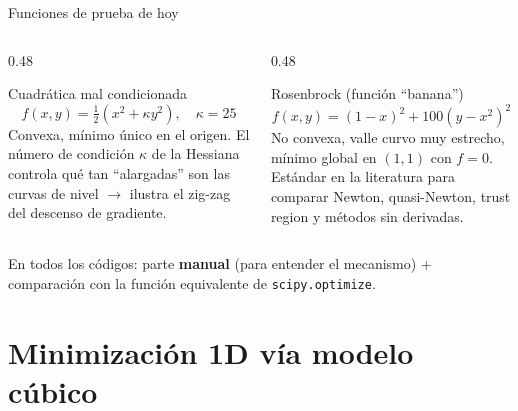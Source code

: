 \documentclass[aspectratio=169]{beamer}
\begin{document}
\begin{frame}{Funciones de prueba de hoy}
  \begin{columns}[T]
    \begin{column}{0.48\textwidth}
      \begin{block}{Cuadr\'atica mal condicionada}
        \[ f(x,y) = \tfrac12\left(x^2 + \kappa y^2\right), \quad \kappa=25 \]
        Convexa, m\'inimo \'unico en el origen. El n\'umero de condici\'on $\kappa$ de la Hessiana controla qu\'e tan ``alargadas'' son las curvas de nivel $\to$ ilustra el zig-zag del descenso de gradiente.
      \end{block}
    \end{column}
    \begin{column}{0.48\textwidth}
      \begin{block}{Rosenbrock (funci\'on ``banana'')}
        \[ f(x,y) = (1-x)^2 + 100(y-x^2)^2 \]
        No convexa, valle curvo muy estrecho, m\'inimo global en $(1,1)$ con $f=0$. Est\'andar en la literatura para comparar Newton, quasi-Newton, trust region y m\'etodos sin derivadas.
      \end{block}
    \end{column}
  \end{columns}
  \vspace{0.3cm}
  \centering\small
  En todos los c\'odigos: parte \textbf{manual} (para entender el mecanismo) + comparaci\'on con la funci\'on equivalente de \texttt{scipy.optimize}.
\end{frame}

\section{Minimizaci\'on 1D v\'ia modelo c\'ubico}
\end{document}
